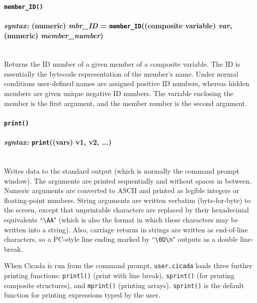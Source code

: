 \documentclass{article}
\begin{document}
\paragraph{\texttt{member\_ID()}\\\\
\normalfont \emph{syntax: } (numeric) \emph{mbr\_ID} = \texttt{member\_ID}((composite variable) \emph{var}, (numeric) \emph{member\_number})\\\\}

Returns the ID number of a given member of a composite variable.  The ID is essentially the bytecode representation of the member's name.  Under normal conditions user-defined names are assigned positive ID numbers, whereas hidden members are given unique negative ID numbers.  The variable enclosing the member is the first argument, and the member number is the second argument.\\






\paragraph{\texttt{print()}\\\\
\normalfont \emph{syntax: } \texttt{print}((vars) v1, v2, ...)\\\\}
 

Writes data to the standard output (which is normally the command prompt window).  The arguments are printed sequentially and without spaces in between.  Numeric arguments are converted to ASCII and printed as legible integers or floating-point numbers.  String arguments are written verbatim (byte-for-byte) to the screen, except that unprintable characters are replaced by their hexadecimal equivalents ``\verb$\AA$" (which is also the format in which these characters may be written into a string).  Also, carriage returns in strings are written as end-of-line characters, so a PC-style line ending marked by ``\verb$\0D\n$" outputs as a double line-break.

When Cicada is run from the command prompt, \verb#user.cicada# loads three further printing functions:  \verb#printl()# (print with line break), \verb#sprint()# (for printing composite structures), and \verb#mprint()# (printing arrays).  \verb#sprint()# is the default function for printing expressions typed by the user.\\
\end{document}
